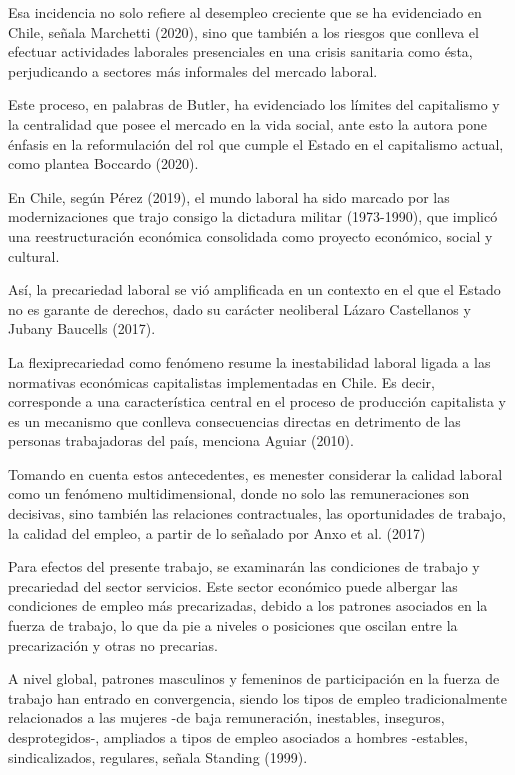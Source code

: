 \documentclass[
]{article}
\begin{document}
Esa incidencia no solo refiere al desempleo creciente que se ha
evidenciado en Chile, señala Marchetti (2020), sino que también a los
riesgos que conlleva el efectuar actividades laborales presenciales en
una crisis sanitaria como ésta, perjudicando a sectores más informales
del mercado laboral.

Este proceso, en palabras de Butler, ha evidenciado los límites del
capitalismo y la centralidad que posee el mercado en la vida social,
ante esto la autora pone énfasis en la reformulación del rol que cumple
el Estado en el capitalismo actual, como plantea Boccardo (2020).

En Chile, según Pérez (2019), el mundo laboral ha sido marcado por las
modernizaciones que trajo consigo la dictadura militar (1973-1990), que
implicó una reestructuración económica consolidada como proyecto
económico, social y cultural.

Así, la precariedad laboral se vió amplificada en un contexto en el que
el Estado no es garante de derechos, dado su carácter neoliberal Lázaro
Castellanos y Jubany Baucells (2017).

La flexiprecariedad como fenómeno resume la inestabilidad laboral ligada
a las normativas económicas capitalistas implementadas en Chile. Es
decir, corresponde a una característica central en el proceso de
producción capitalista y es un mecanismo que conlleva consecuencias
directas en detrimento de las personas trabajadoras del país, menciona
Aguiar (2010).

Tomando en cuenta estos antecedentes, es menester considerar la calidad
laboral como un fenómeno multidimensional, donde no solo las
remuneraciones son decisivas, sino también las relaciones contractuales,
las oportunidades de trabajo, la calidad del empleo, a partir de lo
señalado por Anxo et al. (2017)

Para efectos del presente trabajo, se examinarán las condiciones de
trabajo y precariedad del sector servicios. Este sector económico puede
albergar las condiciones de empleo más precarizadas, debido a los
patrones asociados en la fuerza de trabajo, lo que da pie a niveles o
posiciones que oscilan entre la precarización y otras no precarias.

A nivel global, patrones masculinos y femeninos de participación en la
fuerza de trabajo han entrado en convergencia, siendo los tipos de
empleo tradicionalmente relacionados a las mujeres -de baja
remuneración, inestables, inseguros, desprotegidos-, ampliados a tipos
de empleo asociados a hombres -estables, sindicalizados, regulares,
señala Standing (1999).
\end{document}
